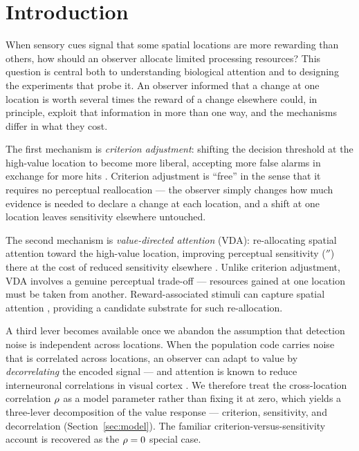 
\section{Introduction}
\label{sec:intro}

When sensory cues signal that some spatial locations are more rewarding
than others, how should an observer allocate limited processing
resources? This question is central both to understanding biological
attention and to designing the experiments that probe it. An observer
informed that a change at one location is worth several times the
reward of a change elsewhere could, in principle, exploit that
information in more than one way, and the mechanisms differ in what they
cost.

The first mechanism is \emph{criterion adjustment}: shifting the
decision threshold at the high-value location to become more liberal,
accepting more false alarms in exchange for more hits
\cite{MullerFindlay1987, posner1980_orienting}. Criterion adjustment is
``free'' in the sense that it requires no perceptual reallocation --- the
observer simply changes how much evidence is needed to declare a change
at each location, and a shift at one location leaves sensitivity
elsewhere untouched.

The second mechanism is \emph{value-directed attention} (VDA):
re-allocating spatial attention toward the high-value location,
improving perceptual sensitivity ($\dprime$) there at the cost of
reduced sensitivity elsewhere \cite{CohenMaunsell2009}. Unlike criterion
adjustment, VDA involves a genuine perceptual trade-off --- resources
gained at one location must be taken from another. Reward-associated
stimuli can capture spatial attention
\cite{failing_theeuwes2018_selection_history, hickey2010_reward_salience_acc},
providing a candidate substrate for such re-allocation.

A third lever becomes available once we abandon the assumption that
detection noise is independent across locations. When the population
code carries noise that is correlated across locations, an observer can
adapt to value by \emph{decorrelating} the encoded signal --- and
attention is known to reduce interneuronal correlations in visual cortex
\cite{CohenMaunsell2009, RuffCohen2016, Srinath2021}. We therefore treat
the cross-location correlation $\rho$ as a model parameter rather than
fixing it at zero, which yields a three-lever decomposition of the
value response --- criterion, sensitivity, and decorrelation
(Section~\ref{sec:model}). The familiar criterion-versus-sensitivity
account is recovered as the $\rho = 0$ special case.


